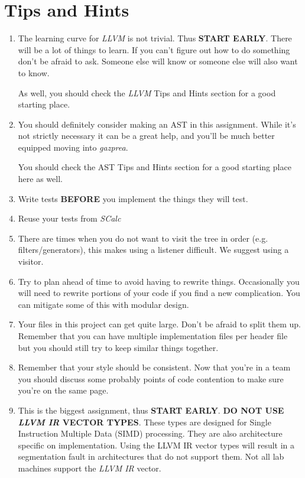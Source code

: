 \documentclass{article}
\begin{document}
\section{Tips and Hints}
\begin{enumerate}
  \item
    The learning curve for \textit{LLVM} is not trivial. Thus \textbf{START EARLY}. There will be a
    lot of things to learn. If you can't figure out how to do something don't be afraid to ask.
    Someone else will know or someone else will also want to know.

    As well, you should check the \textit{LLVM} Tips and Hints section for a good starting place.
  \item
    You should definitely consider making an AST in this assignment. While it's not strictly
    necessary it can be a great help, and you'll be much better equipped moving into
    \textit{gazprea}.

    You should check the AST Tips and Hints section for a good starting place here as well.
  \item
    Write tests \textbf{BEFORE} you implement the things they will test.
  \item
    Reuse your tests from \textit{SCalc}
  \item
    There are times when you do not want to visit the tree in order (e.g. filters/generators), this
    makes using a listener difficult. We suggest using a visitor.
  \item
    Try to plan ahead of time to avoid having to rewrite things. Occasionally you will need to
    rewrite portions of your code if you find a new complication. You can mitigate some of this with
    modular design.
  \item
    Your files in this project can get quite large. Don't be afraid to split them up. Remember that
    you can have multiple implementation files per header file but you should still try to keep
    similar things together.
  \item
    Remember that your style should be consistent. Now that you're in a team you should discuss some
    probably points of code contention to make sure you're on the same page.
  \item
    This is the biggest assignment, thus \textbf{START EARLY}.
    \textbf{DO NOT USE \textit{LLVM IR} VECTOR TYPES}. These types are designed for Single Instruction Multiple Data (SIMD) processing. They are also architecture
    specific on implementation. Using the LLVM IR vector types will result in a segmentation fault in architectures that do not support them. Not
    all lab machines support the \textit{LLVM IR} vector.
\end{enumerate}
\end{document}
